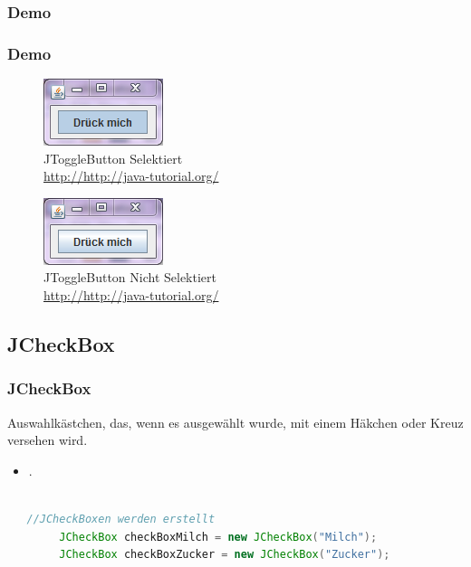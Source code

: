 \documentclass[xcolor=dvipsnames]{beamer}
\begin{document}
\subsubsection{Demo}
\begin{frame}
  \frametitle{Demo}
	\begin{figure}
		\includegraphics[scale=1.0]{images/jtogglebutton_selected.PNG}
		\caption{JToggleButton Selektiert\\ \tiny{\textcolor{gray}{\url{http://http://java-tutorial.org/}}}}
		\end{figure}
\begin{figure}
		\includegraphics[scale=1.0]{images/jtogglebutton_notselected.PNG}
		\caption{JToggleButton Nicht Selektiert \\ \tiny{\textcolor{gray}{\url{http://http://java-tutorial.org/}}}}
		\end{figure}
\end{frame}


\subsection{JCheckBox}
\begin{frame}  %
  \frametitle{JCheckBox} %
  \begin{block}{Auswahlkästchen, das, wenn es ausgewählt wurde, mit einem Häkchen oder Kreuz versehen wird.}
	  \begin{itemize}
		\item .
	  \end{itemize}
  \end{block}

\begin{lstlisting}[language=java,basicstyle=\scriptsize\ttfamily]

   //JCheckBoxen werden erstellt
        JCheckBox checkBoxMilch = new JCheckBox("Milch");
        JCheckBox checkBoxZucker = new JCheckBox("Zucker");

\end{lstlisting}

\end{frame}
\end{document}
